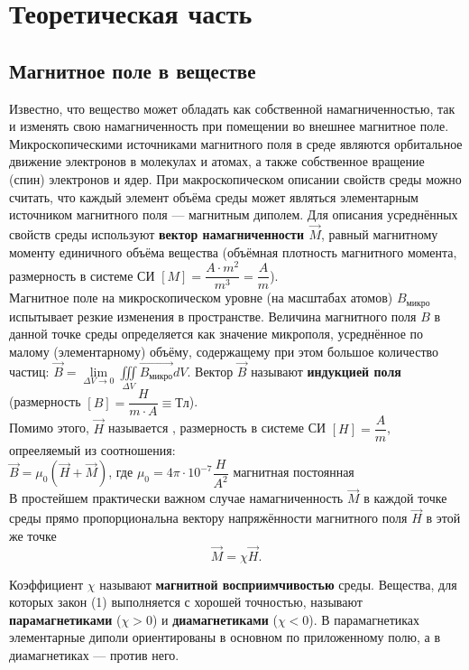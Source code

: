 \documentclass[a4paper]{article}
\begin{document}
	\section{Теоретическая часть}	 
	 \subsection{Магнитное поле в веществе}	 
	Известно, что вещество может обладать как собственной намагниченностью, так и изменять свою намагниченность при помещении во внешнее магнитное поле. Микроскопическими источниками магнитного поля в среде являются орбитальное движение электронов в молекулах и атомах, а также собственное вращение (спин) электронов и ядер. При макроскопическом описании свойств среды можно считать, что каждый элемент объёма среды может являться элементарным источником магнитного поля --- магнитным диполем. Для описания усреднённых свойств
среды используют \textbf{вектор намагниченности $\vec{M}$}, равный магнитному моменту единичного объёма вещества (объёмная плотность магнитного момента, размерность в системе СИ $ [M] = \dfrac{A \cdot m^2}{m^3} =  \dfrac{A}{m}$).\\

Магнитное поле на микроскопическом уровне (на масштабах атомов) $B_{\text{микро}}$ испытывает резкие изменения в пространстве. Величина магнитного поля $B$ в данной точке среды определяется как значение микрополя, усреднённое по малому (элементарному) объёму, содержащему при этом большое количество частиц: 
 $\vec{B}= \lim\limits_{\Delta V \to 0} \iiint\limits_{\Delta V } \vec{B_{\text{микро}}} dV$.
Вектор $\vec{B}$ называют \textbf{индукцией поля} (размерность $ [B] = \dfrac{H}{m\cdot A} \equiv Тл$).\\

Помимо этого, $\vec{H}$ называется , размерность в системе СИ $ [H] =  \dfrac{A}{m}$, опрееляемый из соотношения:\\
$\vec{B} = \mu_{0}(\vec{H}+\vec{M})$, где  $\mu_{0} = 4\pi \cdot 10^{-7} \dfrac{H}{A^2}$ магнитная постоянная \\

В простейшем практически важном случае намагниченность $\vec{M}$ в каждой точке среды прямо пропорциональна вектору напряжённости магнитного поля $\vec{H}$ в этой же точке
\begin{equation}\label{1}
\vec{M} = \chi \vec{H}.
\end{equation}

Коэффициент $\chi$ называют \textbf{магнитной восприимчивостью} среды. Вещества, для которых закон (1) выполняется с хорошей точностью, называют  \textbf{парамагнетиками} ($\chi > 0$) и  \textbf{диамагнетиками} ($\chi < 0$). В парамагнетиках элементарные диполи ориентированы в основном по приложенному полю, а в диамагнетиках — против него.\\
\end{document}
